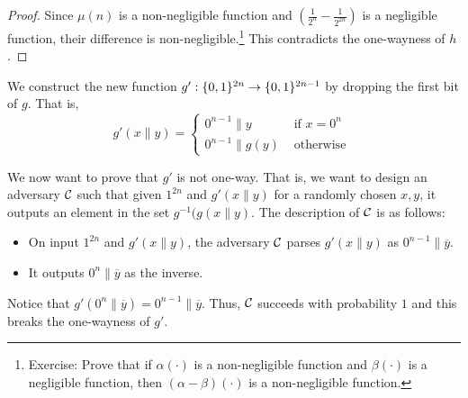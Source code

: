 \begin{proof}
Since $\mu(n)$ is a non-negligible function and $(\frac{1}{2^{n}} - \frac{1}{2^{2n}})$ is a negligible function, their difference is non-negligible.\footnote{Exercise: Prove that if $\alpha(\cdot)$ is a non-negligible function and $\beta(\cdot)$ is a negligible function, then $(\alpha - \beta)(\cdot)$ is a non-negligible function.} This contradicts the one-wayness of $h$.

\end{proof}

We construct the new function $g': \{0,1\}^{2n} \rightarrow \{0,1\}^{2n-1}$ by dropping the first bit of $g$. That is,
$$
g'(x\|y) = \begin{cases}
 0^{n-1}\|y &\text{    if } x = 0^n\\
0^{n-1}\|g(y) &\text{    otherwise }
\end{cases}
$$

We now want to prove that $g'$ is not one-way. That is, we want to design an adversary $\mathcal{C}$ such that given $1^{2n}$ and $g'(x \| y)$ for a randomly chosen $x,y$, it outputs an element in the set $g^{-1}(g(x \| y)$. The description of $\mathcal{C}$ is as follows:

\begin{itemize}
\item On input $1^{2n}$ and $g'(x \| y)$, the adversary $\mathcal{C}$ parses $g'(x \| y)$ as $0^{n-1} \| \overline{y}$.
\item It outputs $0^{n} \| \overline{y}$ as the inverse.
\end{itemize}
Notice that $g'(0^{n} \| \overline{y}) = 0^{n-1} \| \overline{y}$. Thus, $\mathcal{C}$ succeeds with probability $1$ and this breaks the one-wayness of $g'$.



